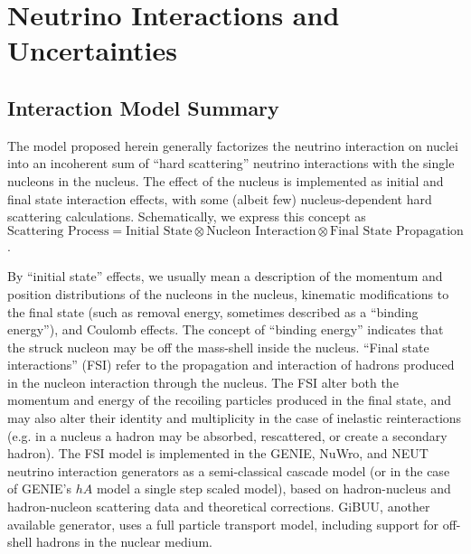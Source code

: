 \section{Neutrino Interactions and Uncertainties}\label{sec:nu-osc-05} \label{sec:physics-lbnosc-nuint}

\subsection{Interaction Model Summary}
  
The model proposed herein generally factorizes the neutrino
interaction on nuclei into an incoherent sum of ``hard scattering'' neutrino interactions with the single nucleons in the nucleus. The effect of the nucleus is implemented as
initial and final state interaction effects, with some (albeit few) nucleus-dependent hard scattering calculations. Schematically, we express this concept as $\text{Scattering Process} = \text{Initial State} \otimes \text{Nucleon Interaction} \otimes \text{Final State Propagation}$.


By ``initial state'' effects, we usually mean a description of the momentum and position distributions of the nucleons in the nucleus, kinematic modifications to the final state (such as removal energy, sometimes described as a ``binding energy''), and Coulomb effects.   The concept of ``binding energy'' indicates that the struck nucleon may be off the mass-shell inside the nucleus.  
``Final state interactions'' (FSI) refer to the propagation and interaction of hadrons produced in the nucleon interaction through the nucleus. The FSI alter both the momentum and energy of the recoiling particles produced in the final state, and may also alter their identity and multiplicity in the case of inelastic reinteractions (e.g. in a nucleus a hadron may be absorbed, rescattered, or create a secondary hadron).  The FSI model is implemented in the GENIE, NuWro, and NEUT neutrino interaction generators as a semi-classical cascade model (or in the case of GENIE's $hA$ model a single step scaled model), based on hadron-nucleus and hadron-nucleon scattering data and theoretical corrections.  GiBUU, another available generator, uses a full particle transport model, including support for off-shell hadrons in the nuclear medium.

